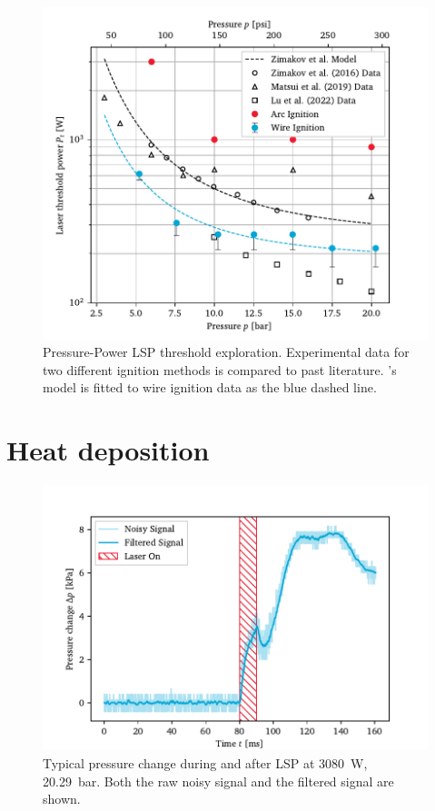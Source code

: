     \begin{figure}[h]
        \centering
        \includegraphics[]{assets/5 results/powerthreshold.pdf}
        \caption[Pressure-Power LSP threshold exploration]{Pressure-Power LSP threshold exploration. Experimental data for two different ignition methods is compared to past literature. \textcite{zimakovInteractionNearIRLaser2016}'s model is fitted to wire ignition data as the blue dashed line.}
        \label{fig:powerthreshold}
    \end{figure}

    \section{Heat deposition}

    \begin{figure}[h]
        \centering
        \includegraphics[]{assets/5 results/pressure_noise.pdf}
        \caption[Typical pressure change during and after LSP]{Typical pressure change during and after LSP at \qty{3080}{W}, \qty{20.29}{bar}. Both the raw noisy signal and the filtered signal are shown.}
        \label{fig:pressure_noise}
    \end{figure}

